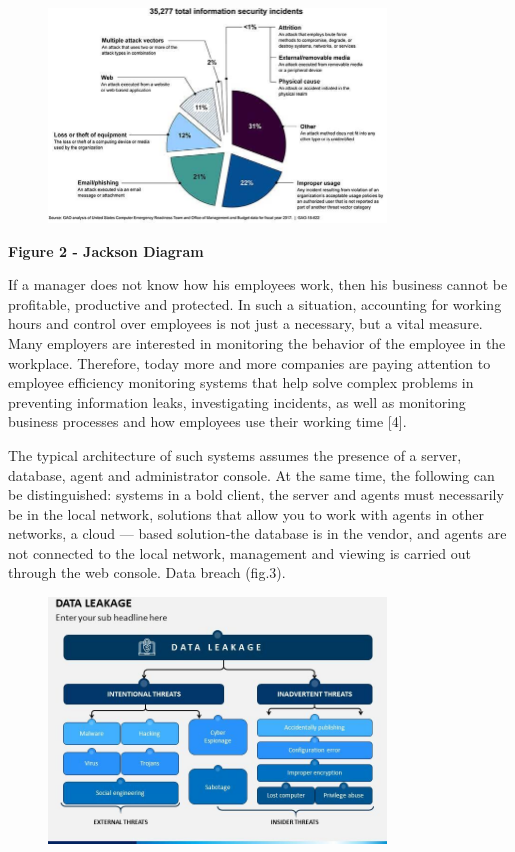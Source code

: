 \begin{figure}[H]
	\centering
	\includegraphics[width=0.8\textwidth]{assets/64}
	\caption*{}
\end{figure}

{\bfseries Figure 2 - Jackson Diagram}

If a manager does not know how his employees work, then his business
cannot be profitable, productive and protected. In such a situation,
accounting for working hours and control over employees is not just a
necessary, but a vital measure. Many employers are interested in
monitoring the behavior of the employee in the workplace. Therefore,
today more and more companies are paying attention to employee
efficiency monitoring systems that help solve complex problems in
preventing information leaks, investigating incidents, as well as
monitoring business processes and how employees use their working time
{[}4{]}.

The typical architecture of such systems assumes the presence of a
server, database, agent and administrator console. At the same time, the
following can be distinguished: systems in a bold client, the server and
agents must necessarily be in the local network, solutions that allow
you to work with agents in other networks, a cloud --- based
solution-the database is in the vendor, and agents are not connected to
the local network, management and viewing is carried out through the web
console. Data breach (fig.3).

\begin{figure}[H]
	\centering
	\includegraphics[width=0.8\textwidth]{assets/65}
	\caption*{}
\end{figure}

